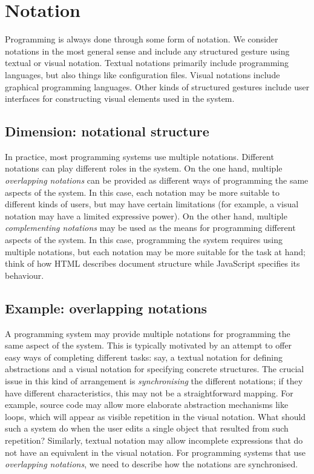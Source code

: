 \documentclass[ twoside,openright,titlepage,numbers=noenddot,headinclude,footinclude,cleardoublepage=empty,abstract=on,
                BCOR=5mm,paper=a4,fontsize=11pt
                ]{scrreprt}
\theoremstyle{definition}
\begin{document}
\hypertarget{notation}{\section{Notation}\label{notation}}


Programming is always done through some form of notation. We consider
notations in the most general sense and include any structured gesture
using textual or visual notation. Textual notations primarily include
programming languages, but also things like configuration files. Visual
notations include graphical programming languages. Other kinds of
structured gestures include user interfaces for constructing visual
elements used in the system.

\hypertarget{dimension-notational-structure}{\subsection{Dimension: notational
structure}\label{dimension-notational-structure}}

In practice, most programming systems use multiple notations. Different
notations can play different roles in the system. On the one hand,
multiple \emph{overlapping notations} can be provided as different ways
of programming the same aspects of the system. In this case, each
notation may be more suitable to different kinds of users, but may have
certain limitations (for example, a visual notation may have a limited
expressive power). On the other hand, multiple \emph{complementing
notations} may be used as the means for programming different aspects of
the system. In this case, programming the system requires using multiple
notations, but each notation may be more suitable for the task at hand;
think of how HTML describes document structure while JavaScript
specifies its behaviour.

\hypertarget{example-overlapping-notations}{\subsection{Example: overlapping
notations}\label{example-overlapping-notations}}

A programming system may provide multiple notations for programming the
same aspect of the system. This is typically motivated by an attempt to
offer easy ways of completing different tasks: say, a textual notation
for defining abstractions and a visual notation for specifying concrete
structures. The crucial issue in this kind of arrangement is
\emph{synchronising} the different notations; if they have different
characteristics, this may not be a straightforward mapping. For example,
source code may allow more elaborate abstraction mechanisms like loops,
which will appear as visible repetition in the visual notation. What
should such a system do when the user edits a single object that
resulted from such repetition? Similarly, textual notation may allow
incomplete expressions that do not have an equivalent in the visual
notation. For programming systems that use \emph{overlapping notations},
we need to describe how the notations are synchronised.
\end{document}
